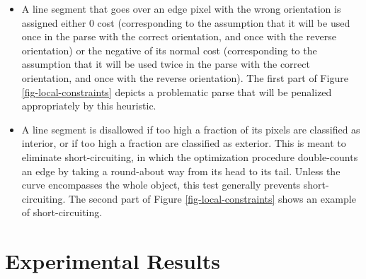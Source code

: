 \begin{itemize}
\item A line segment that goes over an edge pixel with the wrong
  orientation is assigned either $0$ cost (corresponding to the
  assumption that it will be used once in the parse with the correct
  orientation, and once with the reverse orientation) or the negative
  of its normal cost (corresponding to the assumption that it will be
  used twice in the parse with the correct orientation, and once with
  the reverse orientation). The first part of Figure
  \ref{fig-local-constraints} depicts a problematic parse that will be
  penalized appropriately by this heuristic.
\item A line segment is disallowed if too high a fraction of its
  pixels are classified as interior, or if too high a fraction are
  classified as exterior. This is meant to eliminate short-circuiting,
  in which the optimization procedure double-counts an edge by taking
  a round-about way from its head to its tail. Unless the curve
  encompasses the whole object, this test generally prevents
  short-circuiting. The second part of Figure
  \ref{fig-local-constraints} shows an example of short-circuiting.
\end{itemize}

\section{Experimental Results}

